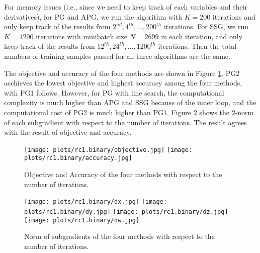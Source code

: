 \documentclass{article}
\numberwithin{equation}{section}
\numberwithin{figure}{section}
\begin{document}
For memory issues (i.e., since we need to keep track of each variables and their derivatives), for PG and APG, we run the algorithm with $K = 200$ iterations and only keep track of the results from $2^{nd}, 4^{th}, \hdots, 200^{th} $ iterations. For SSG, we run $K = 1200$ iterations with minibatch size $N = 2699$ in each iteration, and only keep track of the results from $12^{th}, 24^{th}, \hdots, 1200^{th} $ iterations. Then the total numbers of training samples passed for all three algorithms are the same.

The objective and accuracy of the four methods are shown in Figure \ref{rc1.binary-obj-acc}. PG2 acchieves the lowest objective and highest accuracy among the four methods, with PG1 follows. However, for PG with line search, the computational complexity is much higher than APG and SSG because of the inner loop, and the computational cost of PG2 is much higher than PG1. Figure \ref{rc1.binary-subgradient} shows the 2-norm of each subgradient with respect to the number of iterations. The result agrees with the result of objective and accuracy.

\begin{figure}[h]
\centering
\vbox{
	\texttt{[image: plots/rc1.binary/objective.jpg]}
	\texttt{[image: plots/rc1.binary/accuracy.jpg]}
}
\caption{Objective and Accuracy of the four methods with respect to the number of iterations.}
\label{rc1.binary-obj-acc}
\end{figure}

\begin{figure}[h]
\centering
\vbox{
	\texttt{[image: plots/rc1.binary/dx.jpg]}
	\texttt{[image: plots/rc1.binary/dy.jpg]}
} 
\vbox{
	\texttt{[image: plots/rc1.binary/dz.jpg]}
	\texttt{[image: plots/rc1.binary/dw.jpg]}
}
\caption{Norm of subgradients of the four methods with respect to the number of iterations.}
\label{rc1.binary-subgradient}
\end{figure}
\end{document}

